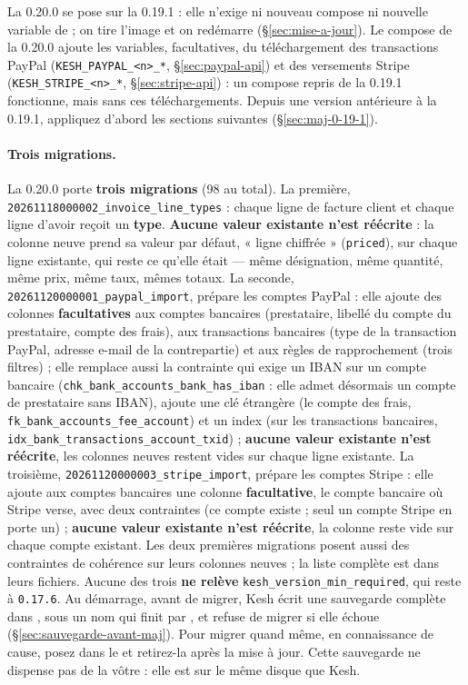 \documentclass[a4paper,11pt,oneside]{article}
\begin{document}
La 0.20.0 se pose sur la 0.19.1 : elle n'exige ni nouveau compose ni nouvelle variable de  ; on tire l'image et on redémarre (\S\ref{sec:mise-a-jour}). Le compose de la 0.20.0 ajoute les variables, facultatives, du téléchargement des transactions PayPal (\texttt{KESH\_PAYPAL\_<n>\_*}, \S\ref{sec:paypal-api}) et des versements Stripe (\texttt{KESH\_STRIPE\_<n>\_*}, \S\ref{sec:stripe-api}) : un compose repris de la 0.19.1 fonctionne, mais sans ces téléchargements. Depuis une version antérieure à la 0.19.1, appliquez d'abord les sections suivantes (\S\ref{sec:maj-0-19-1}).

\paragraph{Trois migrations.} La 0.20.0 porte \textbf{trois migrations} (98 au total). La première, \texttt{20261118000002\_invoice\allowbreak\_line\allowbreak\_types} : chaque ligne de facture client et chaque ligne d'avoir reçoit un \textbf{type}. \textbf{Aucune valeur existante n'est réécrite} : la colonne neuve prend sa valeur par défaut, « ligne chiffrée » (\texttt{priced}), sur chaque ligne existante, qui reste ce qu'elle était --- même désignation, même quantité, même prix, même taux, mêmes totaux. La seconde, \texttt{20261120000001\_paypal\allowbreak\_import}, prépare les comptes PayPal : elle ajoute des colonnes \textbf{facultatives} aux comptes bancaires (prestataire, libellé du compte du prestataire, compte des frais), aux transactions bancaires (type de la transaction PayPal, adresse e-mail de la contrepartie) et aux règles de rapprochement (trois filtres) ; elle remplace aussi la contrainte qui exige un IBAN sur un compte bancaire (\texttt{chk\_bank\_accounts\_bank\_has\_iban} : elle admet désormais un compte de prestataire sans IBAN), ajoute une clé étrangère (le compte des frais, \texttt{fk\_bank\_accounts\_fee\_account}) et un index (sur les transactions bancaires, \texttt{idx\_bank\_transactions\_account\_txid}) ; \textbf{aucune valeur existante n'est réécrite}, les colonnes neuves restent vides sur chaque ligne existante. La troisième, \texttt{20261120000003\_stripe\allowbreak\_import}, prépare les comptes Stripe : elle ajoute aux comptes bancaires une colonne \textbf{facultative}, le compte bancaire où Stripe verse, avec deux contraintes (ce compte existe ; seul un compte Stripe en porte un) ; \textbf{aucune valeur existante n'est réécrite}, la colonne reste vide sur chaque compte existant. Les deux premières migrations posent aussi des contraintes de cohérence sur leurs colonnes neuves ; la liste complète est dans leurs fichiers. Aucune des trois \textbf{ne relève} \texttt{kesh\_version\_min\_required}, qui reste à \texttt{0.17.6}. Au démarrage, avant de migrer, Kesh écrit une sauvegarde complète dans , sous un nom qui finit par , et refuse de migrer si elle échoue (\S\ref{sec:sauvegarde-avant-maj}). Pour migrer quand même, en connaissance de cause, posez  dans le  et retirez-la après la mise à jour. Cette sauvegarde ne dispense pas de la vôtre : elle est sur le même disque que Kesh.
\end{document}
